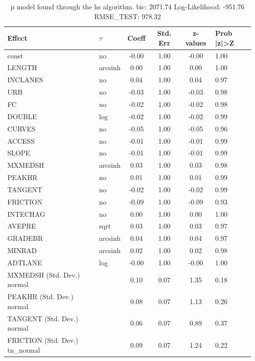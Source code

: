 \begin{table}
	\caption{p model found through the hs algorithm. bic: 2071.74 Log-Likelihood: -951.76 RMSE_TEST: 978.32}
	\begin{center}
		\begin{tabular}{|l|l|c|c|c|l|}
			\hline
			Effect & $\tau$ & Coeff & Std. Err & z-values & Prob |z|>Z \\
			\hline
			const & no & -0.00 & 1.00 & -0.00 & 1.00 \\
			\hline
			LENGTH & arcsinh & 0.00 & 1.00 & 0.00 & 1.00 \\
			\hline
			INCLANES & no & 0.04 & 1.00 & 0.04 & 0.97 \\
			\hline
			URB & no & -0.03 & 1.00 & -0.03 & 0.98 \\
			\hline
			FC & no & -0.02 & 1.00 & -0.02 & 0.98 \\
			\hline
			DOUBLE & log & -0.02 & 1.00 & -0.02 & 0.99 \\
			\hline
			CURVES & no & -0.05 & 1.00 & -0.05 & 0.96 \\
			\hline
			ACCESS & no & -0.01 & 1.00 & -0.01 & 0.99 \\
			\hline
			SLOPE & no & -0.01 & 1.00 & -0.01 & 0.99 \\
			\hline
			MXMEDSH & arcsinh & 0.03 & 1.00 & 0.03 & 0.98 \\
			\hline
			PEAKHR & no & 0.01 & 1.00 & 0.01 & 0.99 \\
			\hline
			TANGENT & no & -0.02 & 1.00 & -0.02 & 0.99 \\
			\hline
			FRICTION & no & -0.09 & 1.00 & -0.09 & 0.93 \\
			\hline
			INTECHAG & no & 0.00 & 1.00 & 0.00 & 1.00 \\
			\hline
			AVEPRE & sqrt & 0.03 & 1.00 & 0.03 & 0.97 \\
			\hline
			GRADEBR & arcsinh & 0.04 & 1.00 & 0.04 & 0.97 \\
			\hline
			MINRAD & arcsinh & 0.02 & 1.00 & 0.02 & 0.98 \\
			\hline
			ADTLANE & log & -0.00 & 1.00 & -0.00 & 1.00 \\
			\hline
			MXMEDSH (Std. Dev.) normal &  & 0.10 & 0.07 & 1.35 & 0.18 \\
			\hline
			PEAKHR (Std. Dev.) normal &  & 0.08 & 0.07 & 1.13 & 0.26 \\
			\hline
			TANGENT (Std. Dev.) normal &  & 0.06 & 0.07 & 0.89 & 0.37 \\
			\hline
			FRICTION (Std. Dev.) tn_normal &  & 0.09 & 0.07 & 1.24 & 0.22 \\

\end{tabular}
\end{center}
\end{table}
